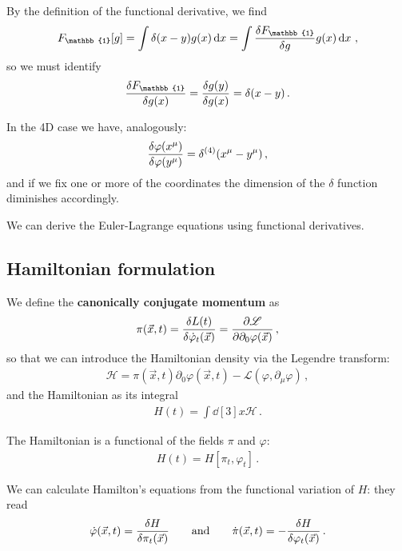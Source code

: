 \documentclass[main.tex]{subfiles}
\begin{document}
By the definition of the functional derivative, we find 
%
\begin{align}
F_{\mathbb{1}} [g] = \int \delta (x-y) g(x) \dd{x} = \int \fdv{F_{\mathbb{1}}}{g} g(x) \dd{x}
\,,
\end{align}
%
so we must identify 
%
\begin{align}
\fdv{F_{\mathbb{1}}}{g(x)} = \fdv{g(y)}{g(x)} = \delta (x -y )
\,.
\end{align}

In the 4D case we have, analogously: 
%
\begin{align}
\fdv{\varphi (x^{\mu })}{ \varphi (y^{\mu })} = \delta^{(4)} (x^{\mu } - y^{\mu })
\,,
\end{align}
%
and if we fix one or more of the coordinates the dimension of the \(\delta \) function diminishes accordingly. 

\begin{claim}
We can derive the Euler-Lagrange equations using functional derivatives.
\end{claim}


\subsection{Hamiltonian formulation}

We define the \textbf{canonically conjugate momentum} as 
%
\begin{align}
\pi (\vec{x}, t) = \fdv{L(t)}{\dot{\varphi}_{t} (\vec{x})} = \pdv{\mathscr{L}}{\partial_0 \varphi (\vec{x})}
\,,
\end{align}
%
so that we can introduce the Hamiltonian density via the Legendre transform: 
%
\begin{align}
\mathscr{H} = \pi (\vec{x}, t) \partial_0 \varphi (\vec{x}, t) - \mathscr{L} (\varphi , \partial_{\mu } \varphi )
\,,
\end{align}
%
and the Hamiltonian as its integral 
%
\begin{align}
H(t) = \int \dd[3]{x} \mathscr{H}
\,.
\end{align}

The Hamiltonian is a functional of the fields \(\pi \) and \(\varphi \): 
%
\begin{align}
H(t) = H[\pi_{t}, \varphi_{t}]
\,.
\end{align}

\begin{claim}
We can calculate Hamilton's equations from the functional variation of \(H\): they read 
%
\begin{align}
\dot{\varphi} (\vec{x}, t) = \fdv{H}{\pi_{t}(\vec{x})}
\qquad \text{and} \qquad
\dot{\pi}(\vec{x}, t) = - \fdv{H}{\varphi_{t}(\vec{x})}
\,.
\end{align}
\end{claim}
\end{document}
